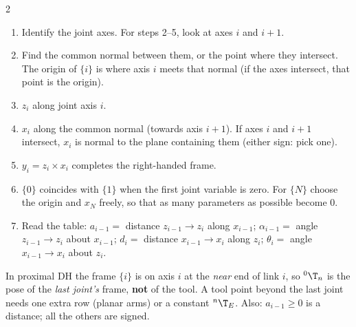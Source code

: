 \begin{multicols}{2}
\begin{recipe}
\begin{enumerate}
\item Identify the joint axes. For steps 2--5, look at axes $i$ and $i{+}1$.
\item Find the common normal between them, or the point where they intersect. The origin of $\{i\}$ is where axis $i$ meets that normal (if the axes intersect, that point is the origin).
\item $z_i$ along joint axis $i$.
\item $x_i$ along the common normal (towards axis $i{+}1$). If axes $i$ and $i{+}1$ intersect, $x_i$ is normal to the plane containing them (either sign: pick one).
\item $y_i=z_i\times x_i$ completes the right-handed frame.
\item $\{0\}$ coincides with $\{1\}$ when the first joint variable is zero. For $\{N\}$ choose the origin and $x_N$ freely, so that as many parameters as possible become 0.
\item Read the table: $a_{i-1}=$ distance $z_{i-1}\to z_i$ along $x_{i-1}$; $\alpha_{i-1}=$ angle $z_{i-1}\to z_i$ about $x_{i-1}$; $d_i=$ distance $x_{i-1}\to x_i$ along $z_i$; $\theta_i=$ angle $x_{i-1}\to x_i$ about $z_i$.
\end{enumerate}
\end{recipe}
\begin{trap}
In proximal DH the frame $\{i\}$ is on axis $i$ at the \emph{near} end of link $i$, so ${}^0\T_n$ is the pose of the \emph{last joint's} frame, \textbf{not} of the tool. A tool point beyond the last joint needs one extra row (planar arms) or a constant ${}^n\T_E$. Also: $a_{i-1}\ge0$ is a distance; all the others are signed.
\end{trap}


\end{multicols}
